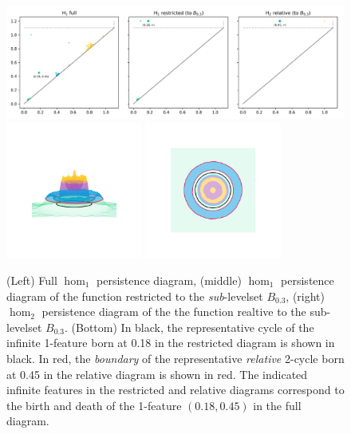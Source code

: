 \begin{figure}[htbp]\label{fig:relative1}
  \centering
  \includegraphics[width=\textwidth]{scripts/figures/relative/dgm-0_0.png}
  \includegraphics[trim=500 800 500 800, clip, width=0.4\textwidth]{scripts/figures/relative/surf_side-0_0.png}
  \includegraphics[trim=500 500 500 500, clip, width=0.4\textwidth]{scripts/figures/relative/surf_top-0_0.png}
  \caption{(Left) Full $\hom_1$ persistence diagram, (middle) $\hom_1$ persistence diagram of the function restricted to the \emph{sub}-levelset $B_{0.3}$, (right) $\hom_2$ persistence diagram of the the function realtive to the sub-levelset $B_{0.3}$.
  (Bottom) In black, the representative cycle of the infinite 1-feature born at 0.18 in the restricted diagram is shown in black.
  In red, the \emph{boundary} of the representative \emph{relative} 2-cycle born at 0.45 in the relative diagram is shown in red.
  The indicated infinite features in the restricted and relative diagrams correspond to the birth and death of the 1-feature $(0.18, 0.45)$ in the full diagram.
  }
\end{figure}

